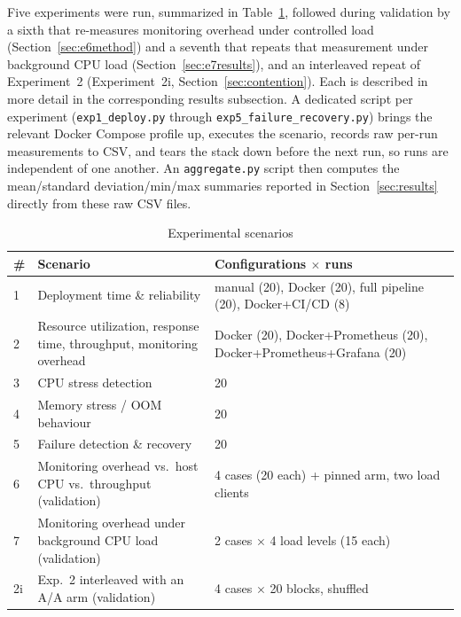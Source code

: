 \documentclass[conference]{IEEEtran}
\begin{document}
Five experiments were run, summarized in Table~\ref{tab:scenarios}, followed
during validation by a sixth that re-measures monitoring overhead under
controlled load (Section~\ref{sec:e6method}) and a seventh that repeats that
measurement under background CPU load (Section~\ref{sec:e7results}), and an
interleaved repeat of Experiment~2 (Experiment~2i, Section~\ref{sec:contention}). Each is
described in more detail in the corresponding results subsection. A
dedicated script per experiment (\texttt{exp1\_deploy.py} through
\texttt{exp5\_failure\_recovery.py}) brings the relevant Docker Compose
profile up, executes the scenario, records raw per-run measurements to CSV,
and tears the stack down before the next run, so runs are independent of one
another. An \texttt{aggregate.py} script then computes the mean/standard
deviation/min/max summaries reported in Section~\ref{sec:results} directly
from these raw CSV files.

\begin{table}[t]
\centering
\caption{Experimental scenarios}
\label{tab:scenarios}
\begin{tabular}{@{}p{0.9cm}p{3.1cm}p{3.6cm}@{}}
\toprule
\textbf{\#} & \textbf{Scenario} & \textbf{Configurations $\times$ runs} \\
\midrule
1 & Deployment time \& reliability & manual (20), Docker (20), full
pipeline (20), Docker+CI/CD (8) \\
2 & Resource utilization, response time, throughput, monitoring overhead &
Docker (20), Docker+Prometheus (20), Docker+Prometheus+Grafana (20) \\
3 & CPU stress detection & 20 \\
4 & Memory stress / OOM behaviour & 20 \\
5 & Failure detection \& recovery & 20 \\
6 & Monitoring overhead vs.\ host CPU vs.\ throughput (validation) & 4 cases (20 each) + pinned arm, two load clients \\
7 & Monitoring overhead under background CPU load (validation) & 2 cases $\times$ 4 load levels (15 each) \\
2i & Exp.~2 interleaved with an A/A arm (validation) & 4 cases $\times$ 20 blocks, shuffled \\
\bottomrule
\end{tabular}
\end{table}
\end{document}
